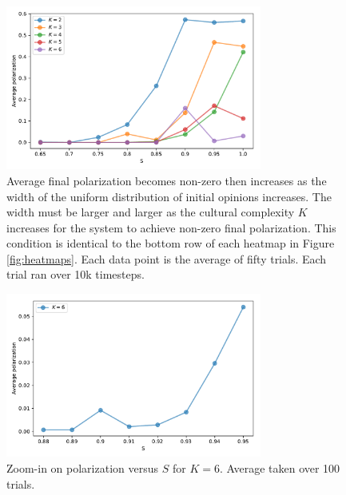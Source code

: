\documentclass[11pt,letterpaper]{article}
\begin{document}
\begin{figure}[t!]
  \centering
  \includegraphics[width=0.75\textwidth]{Figures/P_vs_S_for_K.pdf}
  \caption{
    Average final polarization becomes non-zero then increases as
    the width of the uniform distribution of initial opinions increases.
    The width must be larger and larger as the cultural complexity $K$ 
    increases for the system to achieve non-zero final polarization. This
    condition is identical to the bottom row of each heatmap in 
    Figure \ref{fig:heatmaps}. Each
    data point is the average of fifty trials. Each trial ran over 
    10k timesteps. 
  }
  \label{fig:p_vs_s_for_k}
\end{figure}


\begin{figure}[t!]
  \centering
    \includegraphics[width=0.75\textwidth]{Figures/p_v_s_k6detail.pdf}
  \caption{Zoom-in on polarization versus $S$ for $K=6$. 
  Average taken over 100 trials.}
  \label{fig:zoomK6}
\end{figure}
\end{document}
